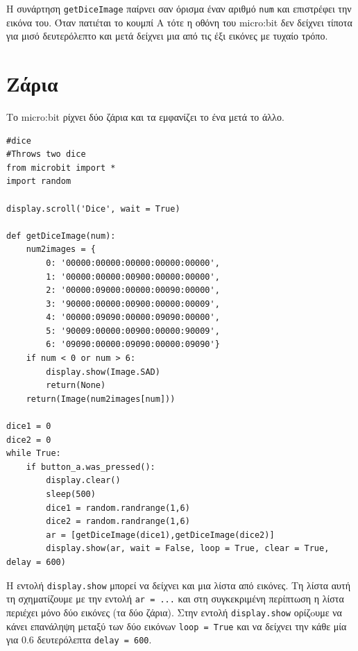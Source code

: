 \documentclass[11pt]{article}
\begin{document}
Η συνάρτηση \lstinline{getDiceImage} παίρνει σαν όρισμα έναν αριθμό \lstinline{num} και επιστρέφει την εικόνα του.
Όταν πατιέται το κουμπί Α τότε η οθόνη του micro:bit δεν δείχνει τίποτα για μισό δευτερόλεπτο και μετά δείχνει μια 
από τις έξι εικόνες με τυχαίο τρόπο.


\section{Ζάρια}
Το micro:bit ρίχνει δύο ζάρια και τα εμφανίζει το ένα μετά το άλλο.
\begin{lstlisting}
#dice
#Throws two dice
from microbit import *
import random

display.scroll('Dice', wait = True)

def getDiceImage(num):
    num2images = {
        0: '00000:00000:00000:00000:00000',
        1: '00000:00000:00900:00000:00000',
        2: '00000:09000:00000:00090:00000',
        3: '90000:00000:00900:00000:00009',
        4: '00000:09090:00000:09090:00000',
        5: '90009:00000:00900:00000:90009',
        6: '09090:00000:09090:00000:09090'}
    if num < 0 or num > 6:
        display.show(Image.SAD)
        return(None)
    return(Image(num2images[num]))

dice1 = 0
dice2 = 0
while True:
    if button_a.was_pressed():
        display.clear()
        sleep(500)
        dice1 = random.randrange(1,6)
        dice2 = random.randrange(1,6)
        ar = [getDiceImage(dice1),getDiceImage(dice2)]
        display.show(ar, wait = False, loop = True, clear = True, delay = 600)
\end{lstlisting}

Η εντολή \lstinline{display.show} μπορεί να δείχνει και μια λίστα από εικόνες. Τη λίστα αυτή τη σχηματίζουμε με την εντολή \lstinline{ar = ...} και στη συγκεκριμένη περίπτωση η λίστα περιέχει μόνο δύο εικόνες  (τα δύο ζάρια). Στην εντολή 
\lstinline{display.show} ορίζoυμε να κάνει επανάληψη μεταξύ των δύο εικόνων \lstinline{loop = True}  και να δείχνει την κάθε μία
για 0.6 δευτερόλεπτα \lstinline{delay = 600}.
\end{document}
